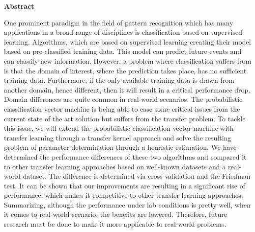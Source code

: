 \begin{center}
	\Large\textbf{Abstract}\\
\end{center}
One prominent paradigm in the field of pattern recognition which has many applications in a broad range of disciplines is classification based on supervised learning. 
Algorithms, which are based on supervised learning creating their model based on pre-classified training data.
This model can predict future events and can classify new information.
However, a problem where classification suffers from is that the domain of interest, where the prediction takes place, has no sufficient training data. 
Furthermore, if the only available training data is drawn from another domain, hence different, then it will result in a critical performance drop.
Domain differences are quite common in real-world scenarios.
The probabilistic classification vector machine is being able to ease some critical issues from the current state of the art solution but suffers from the transfer problem.
To tackle this issue, we will extend the probabilistic classification vector machine with transfer learning through a transfer kernel approach and solve the resulting problem of parameter determination through a heuristic estimation. 
We have determined the performance differences of these two algorithms and compared it to other transfer learning approaches based on well-known datasets and a real-world dataset. 
The difference is determined via cross-validation and the Friedman test.
It can be shown that our improvements are resulting in a significant rise of performance, which makes it competitive to other transfer learning approaches.
Summarizing, although the performance under lab conditions is pretty well, when it comes to real-world scenario, the benefits are lowered.
Therefore, future research must be done to make it more applicable to real-world problems.
